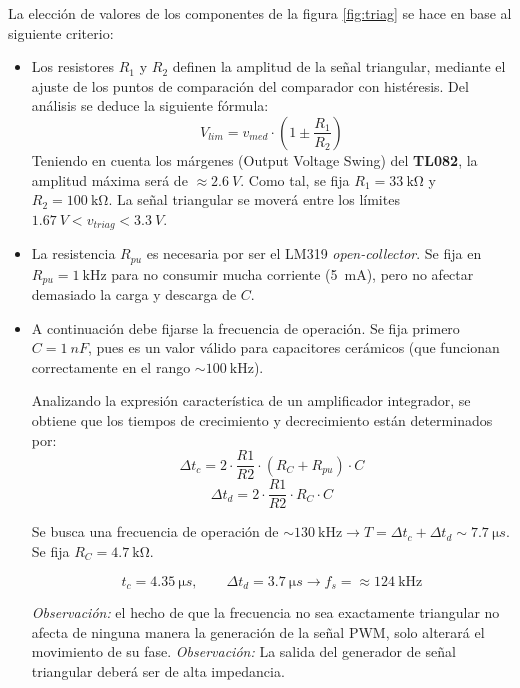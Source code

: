 \documentclass[]{article}
\begin{document}
	La elección de valores de los componentes de la figura \ref{fig:triag} se hace en base al siguiente criterio:
	
	\begin{itemize}
		\item Los resistores $R_1$ y $R_2$ definen la amplitud de la señal triangular, mediante el ajuste de los puntos de comparación del comparador con histéresis. Del análisis se deduce la siguiente fórmula:
		\begin{equation}
			V_{lim} = v_{med} \cdot \left( 1 \pm \frac{R_1}{R_2} \right)
		\end{equation}
		Teniendo en cuenta los márgenes (Output Voltage Swing) del \textbf{TL082}, la amplitud máxima será de $\approx \SI{2.6}{V}$. Como tal, se fija $R_1 = \SI{33}{\kilo\ohm}$ y $R_2 = \SI{100}{\kilo\ohm}$. La señal triangular se moverá entre los límites $\SI{1.67}{V} < v_{triag} < \SI{3.3}{V}$.
		
		\item La resistencia $R_{pu}$ es necesaria por ser el LM319 \textit{open-collector}. Se fija en $R_{pu} = \SI{1}{\kilo\hertz}$ para no consumir mucha corriente (\SI{5}{mA}), pero no afectar demasiado la carga y descarga de $C$.
		
		\item A continuación debe fijarse la frecuencia de operación. Se fija primero $C = \SI{1}{nF}$, pues es un valor válido para capacitores cerámicos (que funcionan correctamente en el rango $\sim \SI{100}{\kilo\hertz}$).
		
		Analizando la expresión característica de un amplificador integrador, se obtiene que los tiempos de crecimiento y decrecimiento están determinados por:
		\begin{equation}
			\Delta t_c = 2 \cdot \frac{R1}{R2} \cdot (R_C + R_{pu}) \cdot C
		\end{equation}
		\begin{equation}
			\Delta t_d = 2 \cdot \frac{R1}{R2} \cdot R_C \cdot C
		\end{equation}
		
		Se busca una frecuencia de operación de $\sim \SI{130}{\kilo\hertz} \to T = \Delta t_c + \Delta t_d \sim \SI{7.7}{\micro s}$.
		Se fija $R_{C} = \SI{4.7}{\kilo\ohm}$.
		
		\begin{equation}
			t_c = \SI{4.35}{\micro s}, \qquad \Delta t_d = \SI{3.7}{\micro s} \to f_s =\approx \SI{124}{\kilo\hertz}
		\end{equation}
		
		\textit{Observación:} el hecho de que la frecuencia no sea exactamente triangular no afecta de ninguna manera la generación de la señal PWM, solo alterará el movimiento de su fase.
		\textit{Observación:} La salida del generador de señal triangular deberá ser de alta impedancia.
	\end{itemize}
	
\end{document}
